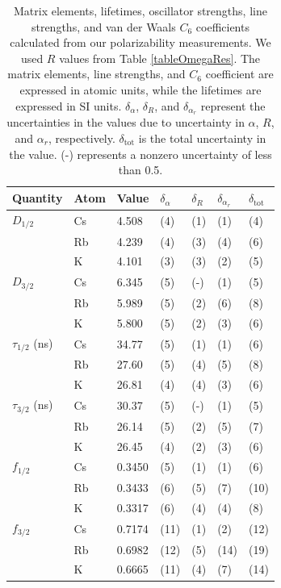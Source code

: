\documentclass[twocolumn,pra,showpacs,superscriptaddress,longbibliography]{revtex4-1}   %
\begin{document}
\begingroup
\begin{table}
\caption{\label{tableMisc}Matrix elements, lifetimes, oscillator strengths, line strengths, and van der Waals $C_6$ coefficients calculated from our polarizability measurements.
We used $R$ values from Table \ref{tableOmegaRes}. The matrix elements, line strengths, and $C_6$ coefficient are expressed in atomic units, while the lifetimes are expressed in SI units.
$\delta_{\alpha}$, $\delta_{R}$, and $\delta_{\alpha_r}$ represent the uncertainties in the values due to uncertainty in $\alpha$, $R$, and $\alpha_r$, respectively. $\delta_{\mathrm{tot}}$ is the total uncertainty in the value. (-) represents a nonzero uncertainty of less than 0.5.}
\begin{center}
\begin{tabular}{lllllll}
\hline\hline
Quantity & Atom & Value & $\delta_{\alpha}$ & $\delta_{R}$ & $\delta_{\alpha_r}$ & $\delta_{\mathrm{tot}}$ \\
\hline
$D_{1/2}$ 		& Cs & 4.508 & (4) & (1) & (1) & (4) \\
 					& Rb & 4.239 & (4) & (3) & (4) & (6) \\
 					& K  & 4.101 & (3) & (3) & (2) & (5) \\ \hline
$D_{3/2}$ 		& Cs & 6.345 & (5) & (-) & (1) & (5) \\
 					& Rb & 5.989 & (5) & (2) & (6) & (8) \\
 					& K  & 5.800 & (5) & (2) & (3) & (6) \\ \hline
$\tau_{1/2}$ (ns) 	& Cs & 34.77 & (5) & (1) & (1) & (6) \\
 					& Rb & 27.60 & (5) & (4) & (5) & (8) \\
 					& K  & 26.81 & (4) & (4) & (3) & (6) \\ \hline
$\tau_{3/2}$ (ns) 	& Cs & 30.37 & (5) & (-) & (1) & (5) \\
 					& Rb & 26.14 & (5) & (2) & (5) & (7) \\
 					& K  & 26.45 & (4) & (2) & (3) & (6) \\ \hline
$f_{1/2}$ 			& Cs & 0.3450 & (5) & (1) & (1) & (6) \\
 					& Rb & 0.3433 & (6) & (5) & (7) & (10) \\
 					& K  & 0.3317 & (6) & (4) & (4) & (8) \\ \hline
$f_{3/2}$ 			& Cs & 0.7174 & (11) & (1) & (2) & (12) \\
 					& Rb & 0.6982 & (12) & (5) & (14) & (19) \\
 					& K  & 0.6665 & (11) & (4) & (7) & (14) \\ \hline

\end{tabular}
\end{center}
\end{table}
\end{document}
